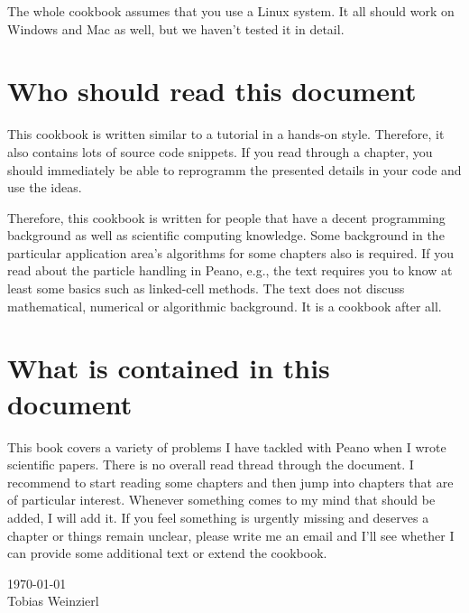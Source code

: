 The whole cookbook assumes that you use a Linux system. It all should work on
Windows and Mac as well, but we haven't tested it in detail.


\section*{Who should read this document}

This cookbook is written similar to a tutorial in a hands-on style.
Therefore, it also contains lots of source code snippets.
If you read through a chapter, you should immediately be able to reprogramm the
presented details in your code and use the ideas.

Therefore, this cookbook is written for people that have a decent programming
background as well as scientific computing knowledge.
Some background in the particular application area's algorithms for some
chapters also is required. 
If you read about the particle handling in Peano, e.g., the text requires you to
know at least some basics such as linked-cell methods.
The text does not discuss mathematical, numerical or algorithmic background.
It is a cookbook after all.


\section*{What is contained in this document}

This book covers a variety of problems I have tackled with Peano when I wrote
scientific papers.
There is no overall read thread through the document.
I recommend to start reading some chapters and then jump into chapters
that are of particular interest.
Whenever something comes to my mind that should be added, I will add it.
If you feel something is urgently missing and deserves a chapter or things
remain unclear, please write me an email and I'll see whether I can provide some
additional text or extend the cookbook.


{
  \flushright
  \today 
  \\ 
  Tobias Weinzierl 
  \\
}

 